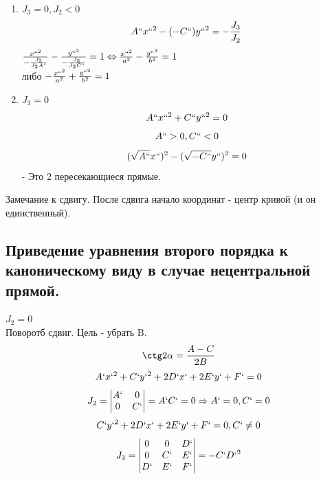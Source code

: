 \documentclass[12pt, a4paper]{article}
\begin{document}
\begin{enumerate}
\begin{enumerate}
			\item $J_3 = 0, J_2 < 0$
				\[ A``x``^2 - (-C``)y``^2 = -\frac{J_3}{J_2} \]
				$\frac{x``^2}{-\frac{J_3}{J_2A``}} - \frac{y``^2}{-\frac{J_3}{J_2C``}} = 1 \Leftrightarrow \frac{x``^2}{a^2} - \frac{y``^2}{b^2} = 1$\\
				либо $ - \frac{x``^2}{a^2} + \frac{y``^2}{b^2} = 1$
			\item $J_3 = 0$\\
				\[ A``x``^2 + C``y``^2 = 0 \]
				\[ A`` > 0, C`` < 0 \]
				\[ (\sqrt{A``}x``)^2 - (\sqrt{-C``}y``)^2 = 0 \]
				- Это 2 пересекающиеся прямые.
		\end{enumerate}
		Замечание к сдвигу. После сдвига начало координат - центр кривой (и он единственный). 
\end{enumerate}

\subsection{Приведение уравнения второго порядка к каноническому виду в случае нецентральной прямой. }
$J_2 = 0$\\
Поворотб сдвиг. Цель - убрать B. 
\[ \ctg 2\alpha = \frac{A-C}{2B} \]
\[ A` x`^2 + C` y`^2 + 2D`x` + 2E`y` + F` = 0 \]
\[ J_2 = \begin{vmatrix}
	A`&0\\
	0&C`
\end{vmatrix} =A`C` = 0 \Rightarrow A` = 0, C` = 0 \]
\[ C`y`^2 + 2 D` x` + 2E` y` + F` = 0, C` \not= 0 \]
\[ J_3 = \begin{vmatrix}
	0&0&D`\\
	0&C`&E` \\
	D`&E`&F`
\end{vmatrix} = -C`D`^2 \]
\end{document}
